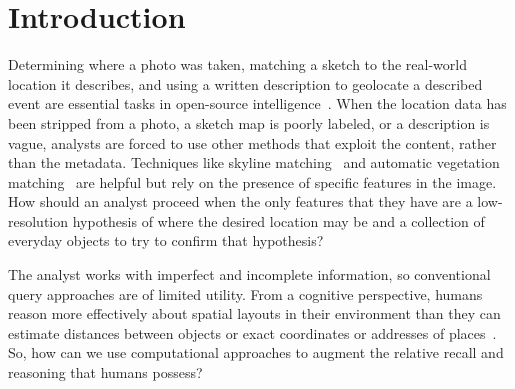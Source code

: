 \section{Introduction}

\label{section:introduction}


\par{
    Determining where a photo was taken, matching a sketch to the real-world location it describes, and using a written description to geolocate a described event are essential tasks in open-source intelligence~\cite{Higgins2021}.
    When the location data has been stripped from a photo, a sketch map is poorly labeled, or a description is vague, analysts are forced to use other methods that exploit the content, rather than the metadata.
    Techniques like skyline matching~\cite{Stein1995, Baatz2012} and automatic vegetation matching~\cite{Schmidt2022} are helpful but rely on the presence of specific features in the image.
    How should an analyst proceed when the only features that they have are a low-resolution hypothesis of where the desired location may be and a collection of everyday objects to try to confirm that hypothesis?
}
\par{
    The analyst works with imperfect and incomplete information, so conventional query approaches are of limited utility. 
    From a cognitive perspective, humans reason more effectively about spatial layouts in their environment than they can estimate distances between objects or exact coordinates or addresses of places~\cite{Schwering2014, Weisberg2016, Miller2013, Keatley2021}.
    So, how can we use computational approaches to augment the relative recall and reasoning that humans possess?
}


